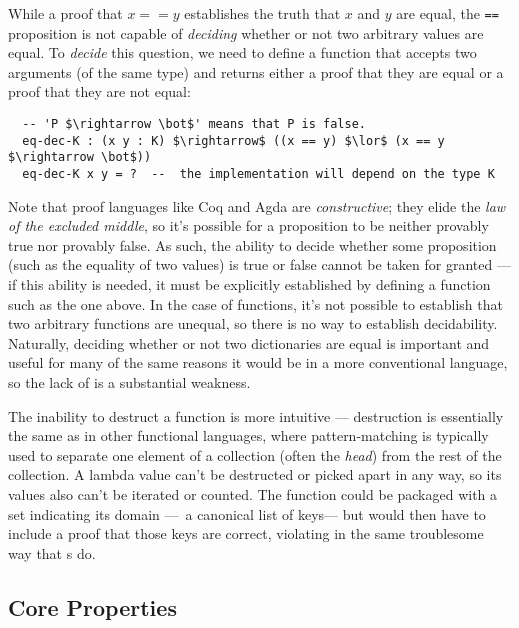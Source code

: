 
While a proof that $x == y$ establishes the truth that $x$ and $y$ are equal, the \texttt{==} proposition is not capable of \emph{deciding} whether or not two arbitrary values are equal.
%
To \emph{decide} this question, we need to define a function that accepts two arguments (of the same type) and returns either a proof that they are equal or a proof that they are not equal:
\begin{lstlisting}
  -- 'P $\rightarrow \bot$' means that P is false.
  eq-dec-K : (x y : K) $\rightarrow$ ((x == y) $\lor$ (x == y $\rightarrow \bot$))
  eq-dec-K x y = ?  --  the implementation will depend on the type K
\end{lstlisting}

Note that proof languages like Coq and Agda are \emph{constructive}; they elide the \emph{law of the excluded middle}, so it's possible for a proposition to be neither provably true nor provably false.
%
As such, the ability to decide whether some proposition (such as the equality of two values) is true or false cannot be taken for granted --- if this ability is needed, it must be explicitly established by defining a function such as the one above.
%
In the case of functions, it's not possible to establish that two arbitrary functions are unequal, so there is no way to establish decidability.
%
Naturally, deciding whether or not two dictionaries are equal is important and useful for many of the same reasons it would be in a more conventional language, so the lack of \DecidableEq{} is a substantial weakness.


The inability to destruct a function is more intuitive --- destruction is essentially the same as in other functional languages, where pattern-matching is typically used to separate one element of a collection (often the \emph{head}) from the rest of the collection.
%
A lambda value can't be destructed or picked apart in any way, so its values also can't be iterated or counted.
%
The function could be packaged with a set indicating its domain ---\ie{}~a canonical list of keys--- but would then have to include a proof that those keys are correct, violating \SemTot{} in the same troublesome way that \cal{}s do.

\subsection{Core Properties}

